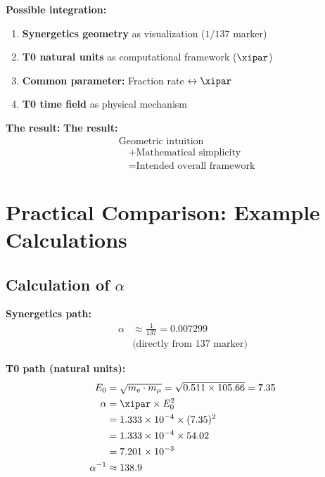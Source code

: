 	\begin{gemeinsam}
		\textbf{Possible integration:}
		
		\begin{enumerate}
			\item \textbf{Synergetics geometry} as visualization ($1/137$ marker)
			\item \textbf{T0 natural units} as computational framework ($\xipar$)
			\item \textbf{Common parameter:} Fraction rate $\leftrightarrow \xipar$
			\item \textbf{T0 time field} as physical mechanism
		\end{enumerate}
		
		\textbf{The result:}
\textbf{The result:}
\begin{equation}
	\boxed{
		\begin{aligned}
			&\text{Geometric intuition} \\
			&\quad + \text{Mathematical simplicity} \\
			&\quad = \text{Intended overall framework}
		\end{aligned}
	}
\end{equation}
	\end{gemeinsam}
	
	\section{Practical Comparison: Example Calculations}
	
	\subsection{Calculation of $\alpha$}
	
	\textbf{Synergetics path:}
	\begin{align}
		\alpha &\approx \frac{1}{137} = 0.007299 \\
		&\text{(directly from 137 marker)}
	\end{align}
	
	\textbf{T0 path (natural units):}
	\begin{align}
		E_0 &= \sqrt{m_e \cdot m_\mu} = \sqrt{0.511 \times 105.66} = 7.35 \\
		\alpha &= \xipar \times E_0^2 \\
		&= 1.333 \times 10^{-4} \times (7.35)^2 \\
		&= 1.333 \times 10^{-4} \times 54.02 \\
		&= 7.201 \times 10^{-3} \\
		\alpha^{-1} &\approx 138.9
	\end{align}

